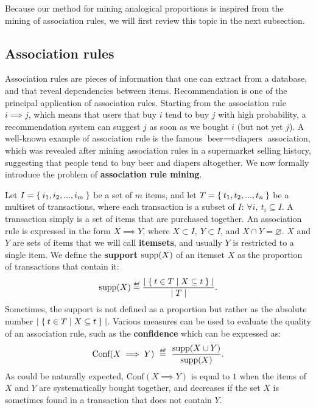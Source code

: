 Because our method for mining analogical proportions is inspired from the mining
of association rules, we will first review this topic in the next subsection.

\subsection{Association rules}

Association rules are pieces of information that one can extract from a
database, and that reveal dependencies between items. Recommendation is one of
the principal application of association rules. Starting from the association
rule $i \implies j$, which means that users that buy $i$ tend to buy $j$ with
high probability, a recommendation system can suggest $j$ as soon as we bought
$i$ (but not yet $j$). A well-known example of association rule is the famous
$\text{beer} \implies \text{diapers}$ association, which was revealed after
mining association rules in a supermarket selling history, suggesting that
people tend to buy beer and diapers altogether. We now formally introduce the
problem of \textbf{association rule mining}.

Let $I = \Set{i_1, i_2, ..., i_m}$ be a set of $m$ items, and let $T =
\Set{t_1, t_2, ..., t_n}$ be a multiset of transactions, where each transaction
is a subset of $I$: $\forall i, ~ t_i \subseteq I$. A transaction simply is a set of items
that are purchased together. An association rule is expressed in the form $ X
\implies
Y$, where $ X \subset I, ~ Y \subset I$, and $X \cap Y = \varnothing$. $X$ and
$ Y $ are sets of items that we will call \textbf {itemsets}, and usually $Y$
is restricted to a single item. We define the \textbf{support} $\text{supp} (X) $ of
an itemset $X$ as the proportion of transactions that contain it:
$$\supp(X) \eqdef \frac{\mid \Set{t \in T | X \subseteq t}\mid}{\mid T \mid}.$$
Sometimes, the support is not defined as a proportion but rather as the
absolute number $\mid \Set{t \in T | X \subseteq t}\mid$. Various
measures can be used to evaluate the quality of an association rule, such as
the \textbf{confidence} which can be expressed as:
$$\text{Conf}(X \implies Y)~\eqdef~\frac{\supp (X \cup Y)}{\supp (X)}.$$
As could be naturally expected, $\text{Conf}(X \implies Y)$ is equal to $1$
when the items of $X$ and $Y$ are systematically bought together, and decreases
if the set $X$ is sometimes found in a transaction that does not contain $Y$.

